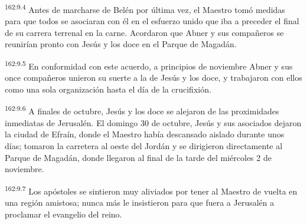 \par
\textsuperscript{162:9.4} Antes de marcharse de Belén por última vez, el Maestro tomó medidas para que todos se asociaran con él en el esfuerzo unido que iba a preceder el final de su carrera terrenal en la carne. Acordaron que Abner y sus compañeros se reunirían pronto con Jesús y los doce en el Parque de Magadán.

\par
\textsuperscript{162:9.5} En conformidad con este acuerdo, a principios de noviembre Abner y sus once compañeros unieron su suerte a la de Jesús y los doce, y trabajaron con ellos como una sola organización hasta el día de la crucifixión.

\par
\textsuperscript{162:9.6} A finales de octubre, Jesús y los doce se alejaron de las proximidades inmediatas de Jerusalén. El domingo 30 de octubre, Jesús y sus asociados dejaron la ciudad de Efraín, donde el Maestro había descansado aislado durante unos días; tomaron la carretera al oeste del Jordán y se dirigieron directamente al Parque de Magadán, donde llegaron al final de la tarde del miércoles 2 de noviembre.

\par
\textsuperscript{162:9.7} Los apóstoles se sintieron muy aliviados por tener al Maestro de vuelta en una región amistosa; nunca más le insistieron para que fuera a Jerusalén a proclamar el evangelio del reino.